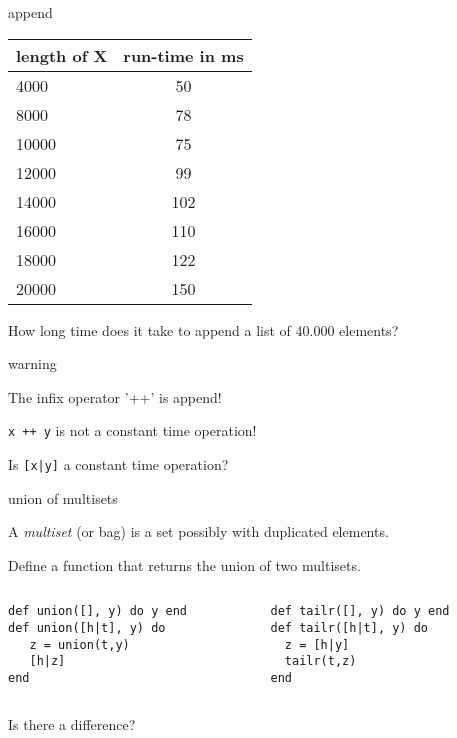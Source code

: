\begin{frame}{append}

\begin{tabular}{|l|c|}
\hline
length of X & run-time in ms\\
\hline
  4000  &     50 \\
  8000  &     78 \\
 10000  &     75 \\
 12000  &     99 \\
 14000  &    102 \\
 16000  &    110 \\
 18000  &    122 \\
 20000  &    150 \\
\hline
\end{tabular}

\pause \vspace{20pt}How long time does it take to append a list of 40.000 elements?

\end{frame}

\begin{frame}{warning}

\pause The infix operator '++' is append! 

\pause\vspace{20pt} {\tt x ++ y} is not a constant time operation!

\pause\vspace{20pt} Is {\tt [x|y]} a constant time operation?

\end{frame}

\begin{frame}[fragile]{union of multisets}

A {\em multiset} (or bag) is a set possibly with duplicated elements.

\pause \vspace{20pt} Define a function that returns the union of two multisets.
\pause

\begin{columns}
  \begin{column}{0.5\textwidth}
\begin{verbatim}
def union([], y) do y end
def union([h|t], y) do
   z = union(t,y)
   [h|z]
end
\end{verbatim}
  \end{column}
\pause
  \begin{column}{0.5\textwidth}
\begin{verbatim}
def tailr([], y) do y end
def tailr([h|t], y) do 
  z = [h|y]
  tailr(t,z)
end
\end{verbatim}
  \end{column}
\end{columns}

\pause\vspace{20pt} Is there a difference?

\end{frame}

